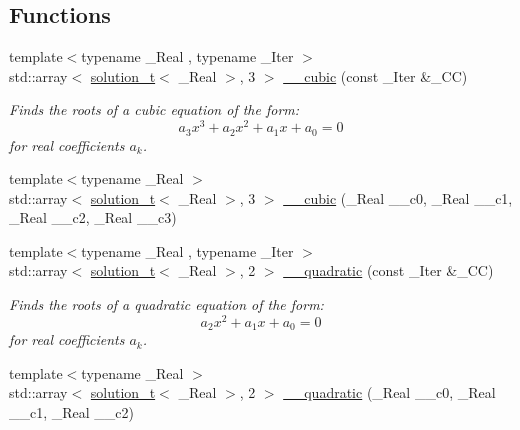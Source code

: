 \subsection*{Functions}
\begin{DoxyCompactItemize}
\item 
{\footnotesize template$<$typename \+\_\+\+Real , typename \+\_\+\+Iter $>$ }\\std\+::array$<$ \hyperlink{namespace____gnu__cxx_ae20ea642de50eb361074c62676b0159c}{solution\+\_\+t}$<$ \+\_\+\+Real $>$, 3 $>$ \hyperlink{namespace____gnu__cxx_a422f638b186be2071012321de5f9bb48}{\+\_\+\+\_\+cubic} (const \+\_\+\+Iter \&\+\_\+\+CC)
\begin{DoxyCompactList}\small\item\em Finds the roots of a cubic equation of the form\+: \[ a_3 x^3 + a_2 x^2 + a_1 x + a_0 = 0 \] for real coefficients $ a_k $. \end{DoxyCompactList}\item 
{\footnotesize template$<$typename \+\_\+\+Real $>$ }\\std\+::array$<$ \hyperlink{namespace____gnu__cxx_ae20ea642de50eb361074c62676b0159c}{solution\+\_\+t}$<$ \+\_\+\+Real $>$, 3 $>$ \hyperlink{namespace____gnu__cxx_ad1ce809c9dd84dd6cd0229fb73f7dbec}{\+\_\+\+\_\+cubic} (\+\_\+\+Real \+\_\+\+\_\+c0, \+\_\+\+Real \+\_\+\+\_\+c1, \+\_\+\+Real \+\_\+\+\_\+c2, \+\_\+\+Real \+\_\+\+\_\+c3)
\item 
{\footnotesize template$<$typename \+\_\+\+Real , typename \+\_\+\+Iter $>$ }\\std\+::array$<$ \hyperlink{namespace____gnu__cxx_ae20ea642de50eb361074c62676b0159c}{solution\+\_\+t}$<$ \+\_\+\+Real $>$, 2 $>$ \hyperlink{namespace____gnu__cxx_aa8c3d98e6508a1e20a17c5980ccbbd99}{\+\_\+\+\_\+quadratic} (const \+\_\+\+Iter \&\+\_\+\+CC)
\begin{DoxyCompactList}\small\item\em Finds the roots of a quadratic equation of the form\+: \[ a_2 x^2 + a_1 x + a_0 = 0 \] for real coefficients $ a_k $. \end{DoxyCompactList}\item 
{\footnotesize template$<$typename \+\_\+\+Real $>$ }\\std\+::array$<$ \hyperlink{namespace____gnu__cxx_ae20ea642de50eb361074c62676b0159c}{solution\+\_\+t}$<$ \+\_\+\+Real $>$, 2 $>$ \hyperlink{namespace____gnu__cxx_af7f59d18caa0bf264f591103478ebcb2}{\+\_\+\+\_\+quadratic} (\+\_\+\+Real \+\_\+\+\_\+c0, \+\_\+\+Real \+\_\+\+\_\+c1, \+\_\+\+Real \+\_\+\+\_\+c2)

\end{DoxyCompactItemize}
